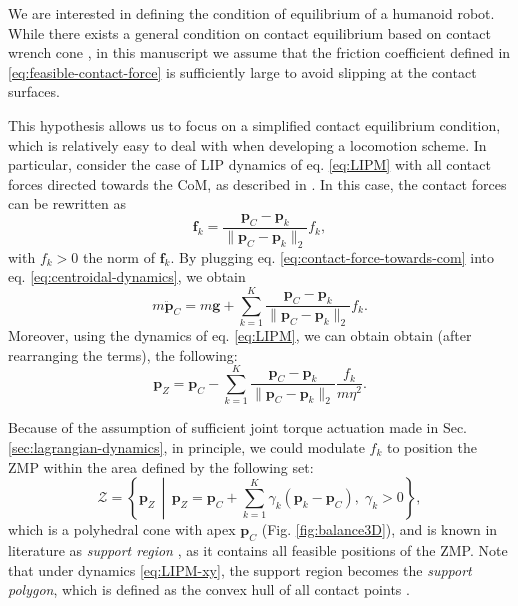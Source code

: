 We are interested in defining the condition of equilibrium of a humanoid robot.
While there exists a general condition on contact
equilibrium based on contact wrench cone \cite{Caron2015RSS}, in this manuscript
we assume that the friction coefficient defined in
\eqref{eq:feasible-contact-force} is sufficiently large to avoid slipping at the
contact surfaces.

This hypothesis allows us to focus on a simplified contact equilibrium
condition, which is relatively easy to deal with when developing a locomotion
scheme. In particular, consider the case of LIP dynamics of eq. \eqref{eq:LIPM}
with all contact forces directed towards the CoM, as described in
\cite{Sugihara2002ICRA}.
In this case, the contact forces can be rewritten as
\begin{equation}
    \label{eq:contact-force-towards-com}
    \bm{f}_k = \frac{\bm{p}_C - \bm{p}_k}{\| \bm{p}_C - \bm{p}_k \|_2} f_k,
\end{equation}
with $f_k>0$ the norm of $\bm{f}_k$. By plugging eq.
\eqref{eq:contact-force-towards-com} into eq.
\eqref{eq:centroidal-dynamics}, we obtain
\begin{equation}
    m \ddot{\bm{p}}_C = m \bm{g} + \sum_{k=1}^K \frac{\bm{p}_C - \bm{p}_k}{\| \bm{p}_C - \bm{p}_k \|_2} f_k.
\end{equation}
Moreover, using the dynamics of eq. \eqref{eq:LIPM}, we can obtain
obtain (after rearranging the terms), the following:
\begin{equation*}
    \bm{p}_Z = \bm{p}_C - \sum_{k=1}^K \frac{\bm{p}_C - \bm{p}_k}{\| \bm{p}_C - \bm{p}_k \|_2} \frac{f_k}{m \eta^2}.
\end{equation*}

Because of the assumption of sufficient joint torque actuation made in Sec.
\ref{sec:lagrangian-dynamics}, in principle, we could modulate $f_k$ to position
the ZMP within the area defined by the following set:
\begin{equation}
    \mathcal{Z} = \left\{ \bm{p}_Z \,\middle\vert\, \bm{p}_Z = \bm{p}_C + \sum_{k=1}^K \gamma_k (\bm{p}_k - \bm{p}_C), \; \gamma_k > 0  \right\},
    \label{eq:ZMP-polyhedral-cone}
\end{equation}
which is a polyhedral cone with apex $\bm{p}_C$ (Fig. \ref{fig:balance3D}), and
is known in literature as \textit{support region} \cite{Sugihara2021ICRA},
as it contains all feasible positions of the ZMP. Note that under dynamics
\eqref{eq:LIPM-xy}, the support region becomes the \textit{support
polygon}, which is defined as the convex hull of all contact points
\cite{SardainBessonnet2004}.

